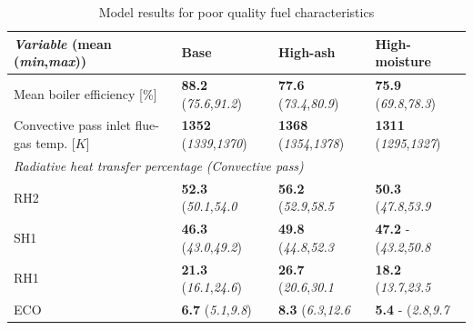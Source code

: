 \documentclass[a4paper,fleqn]{cas-sc}
\begin{document}
\begin{table}[h!]
\caption{Model results for poor quality fuel characteristics}\label{tbl_fuel_results}
\begin{tabular*}{\tblwidth}{p{}p{}p{}p{}}
\toprule
\textit{Variable} (\textbf{mean}  (\textit{min},\textit{max}))& Base & High-ash & High-moisture \\ %
\midrule
Mean boiler efficiency [\%]& \textbf{88.2}  (\textit{75.6},\textit{91.2}) & \textbf{77.6}  (\textit{73.4},\textit{80.9}) & \textbf{75.9}  (\textit{69.8},\textit{78.3})\\
Convective pass inlet flue-gas temp. [$K$]& \textbf{1352}  (\textit{1339},\textit{1370}) & \textbf{1368}  (\textit{1354},\textit{1378}) & \textbf{1311}  (\textit{1295},\textit{1327})\\
\midrule
\multicolumn{4}{l}{\textit{Radiative heat transfer percentage (Convective pass)} }\\
\midrule
RH2 & \textbf{52.3}  (\textit{50.1},\textit{54.0}& \textbf{56.2}  (\textit{52.9},\textit{58.5} & \textbf{50.3}  (\textit{47.8},\textit{53.9}\\
SH1 & \textbf{46.3}  (\textit{43.0},\textit{49.2})& \textbf{49.8}  (\textit{44.8},\textit{52.3}& \textbf{47.2} - (\textit{43.2},\textit{50.8}\\
RH1 & \textbf{21.3}  (\textit{16.1},\textit{24.6})& \textbf{26.7}  (\textit{20.6},\textit{30.1}& \textbf{18.2}  (\textit{13.7},\textit{23.5}\\
ECO & \textbf{6.7}  (\textit{5.1},\textit{9.8})& \textbf{8.3}  (\textit{6.3},\textit{12.6}& \textbf{5.4} - (\textit{2.8},\textit{9.7}\\
\bottomrule
\end{tabular*}
\end{table}  
\end{document}
